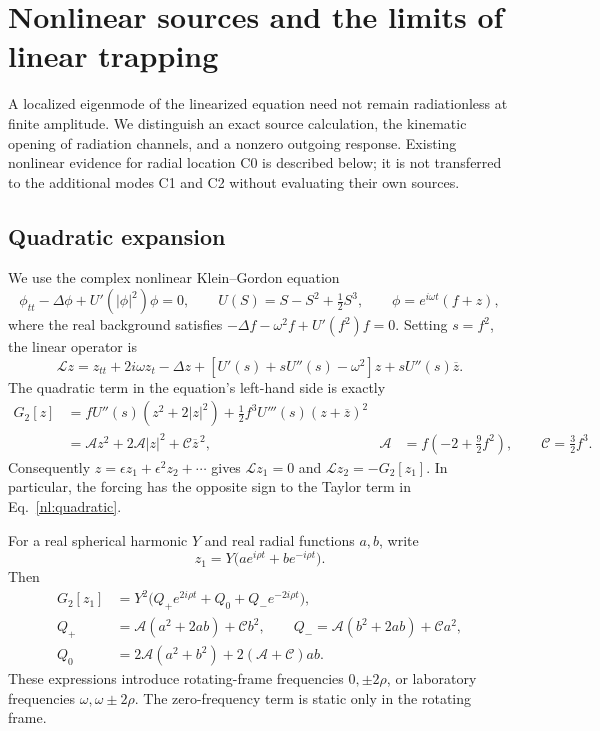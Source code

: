 \section{Nonlinear sources and the limits of linear trapping}
\label{nl:section}

A localized eigenmode of the linearized equation need not remain
radiationless at finite amplitude. We distinguish an exact source
calculation, the kinematic opening of radiation channels, and a nonzero
outgoing response. Existing nonlinear evidence for radial location C0
is described below; it is not transferred to the additional modes C1
and C2 without evaluating their own sources.

\subsection{Quadratic expansion}
\label{nl:expansion}
We use the complex nonlinear Klein--Gordon equation
\begin{equation}
 \phi_{tt}-\Delta\phi+U'(|\phi|^2)\phi=0,
 \qquad U(S)=S-S^2+\tfrac12 S^3,
 \qquad \phi=e^{i\omega t}(f+z),
 \label{nl:model}
\end{equation}
where the real background satisfies
$-\Delta f-\omega^2f+U'(f^2)f=0$. Setting $s=f^2$, the linear operator is
\begin{equation}
 \mathcal Lz=z_{tt}+2i\omega z_t-\Delta z
 +[U'(s)+sU''(s)-\omega^2]z+sU''(s)\overline z.
 \label{nl:linear}
\end{equation}
The quadratic term in the equation's left-hand side is exactly
\begin{align}
 G_2[z]&=fU''(s)(z^2+2|z|^2)
       +\tfrac12 f^3U'''(s)(z+\overline z)^2 \nonumber\\
       &=\mathcal A z^2+2\mathcal A|z|^2+\mathcal C\overline z^{\,2},
 &\mathcal A&=f\left(-2+\tfrac92f^2\right),
 \qquad \mathcal C=\tfrac32f^3.
 \label{nl:quadratic}
\end{align}
Consequently $z=\epsilon z_1+\epsilon^2z_2+\cdots$ gives
$\mathcal Lz_1=0$ and $\mathcal Lz_2=-G_2[z_1]$. In particular, the
forcing has the opposite sign to the Taylor term in
Eq.~\eqref{nl:quadratic}.

For a real spherical harmonic $Y$ and real radial functions $a,b$, write
\begin{equation}
 z_1=Y\bigl(ae^{i\rho t}+be^{-i\rho t}\bigr).
\end{equation}
Then
\begin{align}
 G_2[z_1]&=Y^2\bigl(Q_+e^{2i\rho t}+Q_0+Q_-e^{-2i\rho t}\bigr),\\
 Q_+&=\mathcal A(a^2+2ab)+\mathcal Cb^2,\qquad
 Q_-=\mathcal A(b^2+2ab)+\mathcal Ca^2,\\
 Q_0&=2\mathcal A(a^2+b^2)+2(\mathcal A+\mathcal C)ab.
 \label{nl:coefficients}
\end{align}
These expressions introduce rotating-frame frequencies $0,\pm2\rho$,
or laboratory frequencies $\omega,\omega\pm2\rho$. The zero-frequency
term is static only in the rotating frame.

